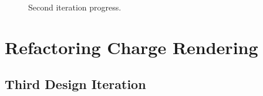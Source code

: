 \documentclass[nobib, a4paper, twoside, justified]{tufte-book}
\newcommand{\todo}[1]{{\noindent\textcolor{Red}{\textit{\quad#1}}\par}}
\begin{document}
\begin{figure}
  \centering
  \qquad
  \caption{Second iteration progress.}%
  \label{fig:second_iteration_progress}
\end{figure}





\section{Refactoring Charge Rendering}%
\label{sec:refactoring_charge_rendering}

\subsection{Third Design Iteration}%
\label{sub:third_design_iteration}
\end{document}

